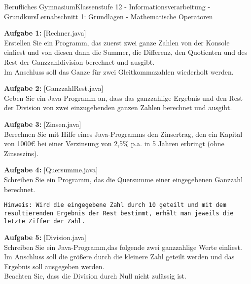 \documentclass[oneside,openany,headings=optiontotoc,11pt,numbers=noenddot]{scrreprt}
\begin{document}
	\begin{worksheet}{Berufliches Gymnasium}{Klassenstufe 12 - Informationsverarbeitung - Grundkurs}{Lernabschnitt 1: Grundlagen - Mathematische Operatoren}
				
		\noindent
		\sffamily
		\begin{framed}
			\noindent
			\textbf{Aufgabe 1:} [Rechner.java]\\
			Erstellen Sie ein Programm, das zuerst zwei ganze Zahlen von der Konsole einliest und von diesen dann die Summer, die Differenz, den Quotienten und des Rest der Ganzzahldivision berechnet und ausgibt.\\
			Im Anschluss soll das Ganze für zwei Gleitkommazahlen wiederholt werden.\\
			\par\noindent
			\textbf{Aufgabe 2:} [GanzzahlRest.java]\\
			Geben Sie ein Java-Programm an, dass das ganzzahlige Ergebnis und den Rest der Division von zwei einzugebenden ganzen Zahlen berechnet und ausgibt.\\
			\par\noindent
			\textbf{Aufgabe 3:} [Zinsen.java]\\
			Berechnen Sie mit Hilfe eines Java-Programms den Zinsertrag, den ein Kapital von 1000\euro{} bei einer Verzinsung von 2,5\% p.a. in 5 Jahren erbringt (ohne Zinseszins).\\
			\par\noindent
			\textbf{Aufgabe 4:} [Quersumme.java]\\
			Schreiben Sie ein Programm, das die Quersumme einer eingegebenen Ganzzahl berechnet.\\
			\par\noindent
			\texttt{Hinweis: Wird die eingegebene Zahl durch 10 geteilt und mit dem resultierenden Ergebnis der Rest bestimmt, erhält man jeweils die letzte Ziffer der Zahl.}\\
			\par\noindent
			\textbf{Aufgabe 5:} [Division.java]\\
			Schreiben Sie ein Java-Programm,das folgende zwei ganzzahlige Werte einliest. Im Anschluss soll die größere durch die kleinere Zahl geteilt werden und das Ergebnis soll ausgegeben werden.\\
			Beachten Sie, dass die Division durch Null nicht zulässig ist.
		\end{framed}
	\end{worksheet}
\end{document}
